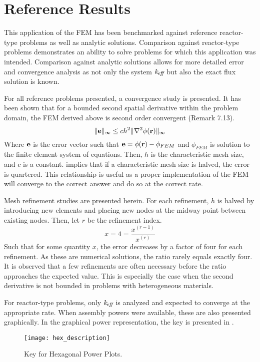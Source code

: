 \section{Reference Results}
  This application of the FEM has been benchmarked against reference 
  reactor-type problems as well as analytic solutions. Comparison
  against reactor-type problems demonstrates an ability to solve problems for
  which this application was intended. Comparison against analytic solutions 
  allows for more detailed error and convergence analysis as not only the system
  $k_{\!\mbox{\scriptsize \em eff}}$ but also the exact flux solution is known.
  
  For all reference problems presented, a convergence study is presented. It has 
  been shown that for a bounded second spatial derivative within the problem 
  domain, the FEM derived above is second order convergent \cite{textbookli} 
  (Remark 7.13).
  \begin{equation} \label{eq:error_bound}
    \|\mathbf{e}\|_{\infty} \le c h^2 \| \mathbf{\nabla}^2 \phi(\mathbf{r}) \|_{\infty}
  \end{equation}
  Where $\mathbf{e}$ is the error vector such that $\mathbf{e} = \phi(\mathbf{r}) - \phi_{FEM}$ and
  $\phi_{FEM}$ is solution to the finite element system of equations. Then,
  $h$ is the characteristic mesh size, and $c$ is a constant. 
   implies that if a characteristic mesh size is halved, 
  the error is quartered. This relationship is useful as a proper implementation 
  of the FEM will converge to the correct answer and do so at the correct rate.
  
  Mesh refinement studies are presented herein. For each refinement, $h$ is 
  halved by introducing new elements and placing new nodes at the midway point
  between existing nodes. Then, let $r$ be the refinement index.
  \begin{equation}
    x = 4 = \frac{x^{(r-1)}}{x^{(r)}}
  \end{equation}
  Such that for some quantity $x$, the error decreases by a factor of four for 
  each refinement. As these are numerical solutions, the ratio rarely equals 
  exactly four. It is observed that a few refinements are often necessary 
  before the ratio approaches the expected value. This is especially the case
  when the second derivative is not bounded in problems with heterogeneous 
  materials.
  
  For reactor-type problems, only $k_{\!\mbox{\scriptsize \em eff}}$ is analyzed and expected to converge
  at the appropriate rate. When assembly powers were available, these are also
  presented graphically. In the graphical power representation, the key is 
  presented in .
  \begin{figure}
    \centering
    \texttt{[image: hex\_description]}
    \caption{Key for Hexagonal Power Plots.}
    \label{fig:hex_description}
  \end{figure}
  
